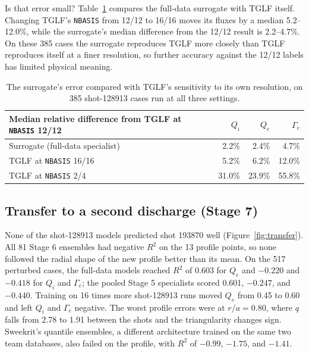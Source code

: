 \documentclass[12pt,letterpaper]{article}
\begin{document}
Is that error small? Table~\ref{tab:resolution} compares the full-data surrogate with TGLF
itself. Changing TGLF's \texttt{NBASIS} from 12/12 to 16/16 moves its fluxes by a median
5.2--12.0\%, while the surrogate's median difference from the 12/12 result is 2.2--4.7\%.
On these 385 cases the surrogate reproduces TGLF more closely than TGLF reproduces itself at
a finer resolution, so further accuracy against the 12/12 labels has limited physical
meaning.

\begin{table}[tbp]
  \centering
  \small
  \begin{tabular}{lrrr}
    \toprule
    Median relative difference from TGLF at \texttt{NBASIS} 12/12 & $Q_i$ & $Q_e$ & $\Gamma_e$ \\
    \midrule
    Surrogate (full-data specialist) & 2.2\% & 2.4\% & 4.7\% \\
    TGLF at \texttt{NBASIS} 16/16 & 5.2\% & 6.2\% & 12.0\% \\
    TGLF at \texttt{NBASIS} 2/4 & 31.0\% & 23.9\% & 55.8\% \\
    \bottomrule
  \end{tabular}
  \caption{The surrogate's error compared with TGLF's sensitivity to its own resolution,
    on 385 shot-128913 cases run at all three settings.}
  \label{tab:resolution}
\end{table}

\subsection{Transfer to a second discharge (Stage 7)}
\label{sec:res-transfer}

None of the shot-128913 models predicted shot 193870 well (Figure~\ref{fig:transfer}). All
81 Stage 6 ensembles had negative $R^2$ on the 13 profile points, so none followed the
radial shape of the new profile better than its mean. On the 517 perturbed cases, the
full-data models reached $R^2$ of 0.603 for $Q_e$ and $-0.220$ and $-0.418$ for $Q_i$ and
$\Gamma_e$; the pooled Stage 5 specialists scored 0.601, $-0.247$, and $-0.440$. Training on
16 times more shot-128913 runs moved $Q_e$ from 0.45 to 0.60 and left $Q_i$ and $\Gamma_e$
negative. The worst profile errors were at $r/a=0.80$, where $q$ falls from 2.78 to 1.91
between the shots and the triangularity changes sign. Sweekrit's quantile ensembles, a different architecture
trained on the same two team databases, also failed on the profile, with $R^2$ of $-0.99$,
$-1.75$, and $-1.41$.
\end{document}
